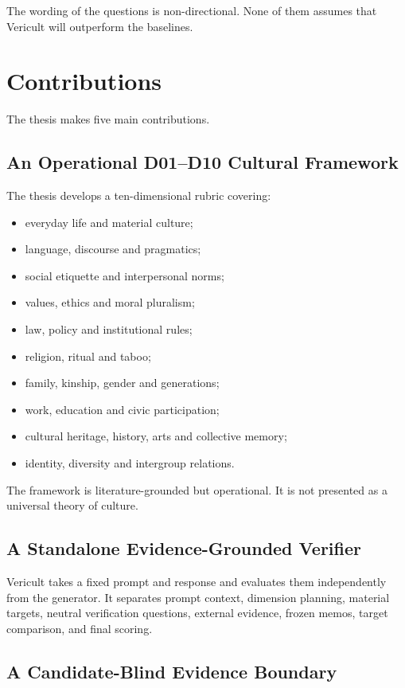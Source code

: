 The wording of the questions is non-directional. None of them assumes that Vericult will outperform the baselines.

\section{Contributions}

The thesis makes five main contributions.

\subsection{An Operational D01--D10 Cultural Framework}

The thesis develops a ten-dimensional rubric covering:

\begin{itemize}
\item everyday life and material culture;
\item language, discourse and pragmatics;
\item social etiquette and interpersonal norms;
\item values, ethics and moral pluralism;
\item law, policy and institutional rules;
\item religion, ritual and taboo;
\item family, kinship, gender and generations;
\item work, education and civic participation;
\item cultural heritage, history, arts and collective memory;
\item identity, diversity and intergroup relations.
\end{itemize}

The framework is literature-grounded but operational. It is not presented as a universal theory of culture.

\subsection{A Standalone Evidence-Grounded Verifier}

Vericult takes a fixed prompt and response and evaluates them independently from the generator. It separates prompt context, dimension planning, material targets, neutral verification questions, external evidence, frozen memos, target comparison, and final scoring.

\subsection{A Candidate-Blind Evidence Boundary}

